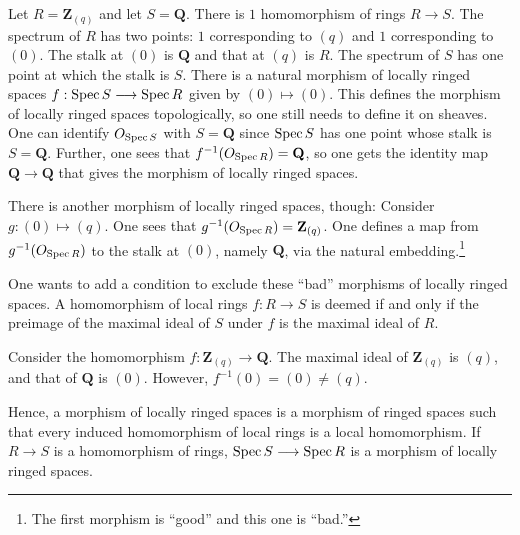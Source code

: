 \documentclass [11 pt, oneside] {article}
\begin{document}
\begin{example}[ ]\label{}\text{}
Let $R= \mathbf{Z}_{(q)}$ and let $S=\mathbf{Q}$. There is $1$ homomorphism of rings $R\longrightarrow S$. The spectrum of $R$ has two points: $1$ corresponding to $(q)$ and $1$ corresponding to $ (0)$. The stalk at $(0)$ is $\mathbf{Q}$ and that at $(q)$ is $R$. The spectrum of $S$ has one point at which the stalk is $S$. There is a natural morphism of locally ringed spaces $f:\operatorname{Spec} S \longrightarrow \operatorname{Spec} R$ given by $(0)\longmapsto  (0)$. This defines the morphism of locally ringed spaces topologically, so one still needs to define it on sheaves. One can identify $\relax{O}_{\operatorname{Spec} S}$ with $S=\mathbf{Q}$ since $\operatorname{Spec} S$ has one point whose stalk is $S=\mathbf{Q}$. Further, one sees that $f^{-1}(\relax{O}_{\operatorname{Spec} R})= \mathbf{Q}$, so one gets the identity map $\mathbf{Q}\longrightarrow \mathbf{Q}$ that gives the morphism of locally ringed spaces.

There is another morphism of locally ringed spaces, though: Consider $g:(0)\longmapsto  (q)$. One sees that $g^{-1}(\relax{O}_{\operatorname{Spec} R})= \mathbf{Z}_{(q)}$. One defines a map from $g^{-1}(\relax{O}_{\operatorname{Spec} R})$ to the stalk at $(0)$, namely $\mathbf{Q}$, via the natural embedding.\footnote{The first morphism is ``good'' and this one is ``bad.''} 
\end{example}

One wants to add a condition to exclude these ``bad'' morphisms of locally ringed spaces. A homomorphism of local rings $f:R\longrightarrow S$ is deemed  if and only if the preimage of the maximal ideal of $S$ under $f$ is the maximal ideal of $R$.

\begin{example}\label{}\text{}
Consider the homomorphism $f:\mathbf{Z}_{(q)} \longrightarrow \mathbf{Q}$. The maximal ideal of $ \mathbf{Z}_{(q)}$ is $(q)$, and that of $\mathbf{Q}$ is $(0)$. However, $f^{-1}(0)=  (0)\ne  (q)$. 
\end{example}

Hence, a morphism of locally ringed spaces is a morphism of ringed spaces such that every induced homomorphism of local rings is a local homomorphism. If $R\longrightarrow S$ is a homomorphism of rings, $\operatorname{Spec} S\longrightarrow \operatorname{Spec} R$ is a morphism of locally ringed spaces.
\end{document}
